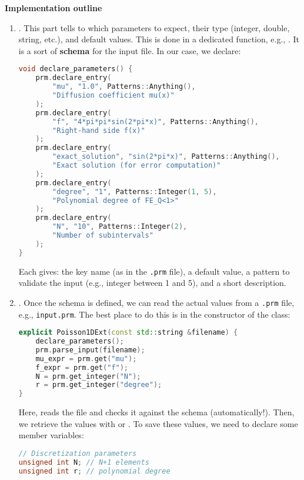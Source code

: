 \highspace
\begin{flushleft}
    \textcolor{Green3}{ \textbf{Implementation outline}}
\end{flushleft}
\begin{enumerate}
    \item {}. This part tells to  which parameters to expect, their type (integer, double, string, etc.), and default values. This is done in a dedicated function, e.g., . It is a sort of \textbf{schema} for the input file. In our case, we declare:
    \begin{lstlisting}[language=C++]
void declare_parameters() {
    prm.declare_entry(
        "mu", "1.0", Patterns::Anything(),
        "Diffusion coefficient mu(x)"
    );
    prm.declare_entry(
        "f", "4*pi*pi*sin(2*pi*x)", Patterns::Anything(),
        "Right-hand side f(x)"
    );
    prm.declare_entry(
        "exact_solution", "sin(2*pi*x)", Patterns::Anything(),
        "Exact solution (for error computation)"
    );
    prm.declare_entry(
        "degree", "1", Patterns::Integer(1, 5),
        "Polynomial degree of FE_Q<1>"
    );
    prm.declare_entry(
        "N", "10", Patterns::Integer(2),
        "Number of subintervals"
    );
}\end{lstlisting}
    Each  gives: the key name (as in the \texttt{.prm} file), a default value, a pattern to validate the input (e.g., integer between 1 and 5), and a short description.


    \item {}. Once the schema is defined, we can read the actual values from a \texttt{.prm} file, e.g., \texttt{input.prm}. The best place to do this is in the constructor of the  class:
    \begin{lstlisting}[language=C++]
explicit Poisson1DExt(const std::string &filename) {
    declare_parameters();
    prm.parse_input(filename);
    mu_expr = prm.get("mu");
    f_expr = prm.get("f");
    N = prm.get_integer("N");
    r = prm.get_integer("degree");
}\end{lstlisting}
    Here,  reads the file and checks it against the schema (automatically!). Then, we retrieve the values with  or . To save these values, we need to declare some member variables:
    \begin{lstlisting}[language=C++,mathescape=true]
// Discretization parameters
unsigned int N; // N+1 elements
unsigned int r; // polynomial degree


\end{lstlisting}
\end{enumerate}
